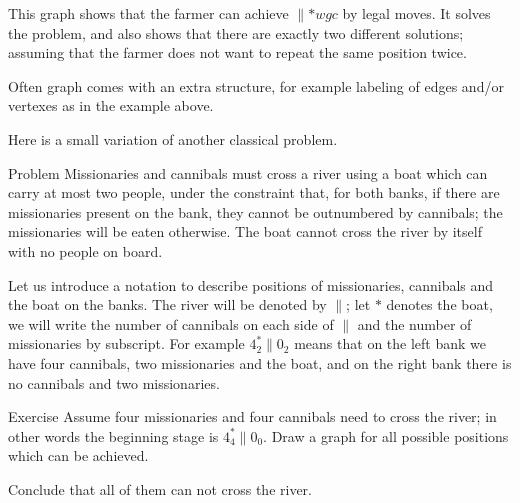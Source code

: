 \begin{center}
\end{center}

This graph shows that the farmer can achieve ${}{\parallel}{{*}wgc}$ by legal moves.
It solves the problem, and also shows that there are exactly two different solutions;
assuming that the farmer does not want to repeat the same position twice. 
\qeds

Often graph comes with an extra structure, for example labeling of edges and/or vertexes as in the example above.

Here is a small variation of another classical problem.

\begin{thm}{Problem} Missionaries and cannibals must cross a river using a boat which can carry at most two people, under the constraint that, for both banks, if there are missionaries present on the bank, they cannot be outnumbered by cannibals; the missionaries will be eaten otherwise.
The boat cannot cross the river by itself with no people on board.
\end{thm}

Let us introduce a notation to describe positions of missionaries, cannibals and the boat on the banks.
The river will be denoted by ${\parallel}$;
let $*$ denotes the boat, we will write the number of cannibals on each side of ${\parallel}$ and the number of missionaries by subscript. 
For example $4_2^*{\parallel}0_2$ means that on the left bank we have four cannibals, two missionaries and the boat, and on the right bank there is no cannibals and two missionaries.

\begin{thm}{Exercise}
Assume four missionaries and four cannibals need to cross the river; in other words the beginning stage is $4_4^*{\parallel}0_0$.
Draw a graph for all possible positions which can be achieved.

Conclude that all of them can not cross the river.
\end{thm}

